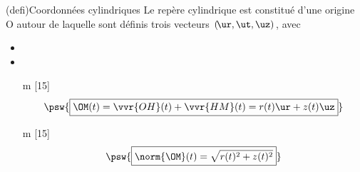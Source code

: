\documentclass[../../main/main.tex]{subfiles}
\begin{document}
\begin{tcb*}[sidebyside, righthand ratio=.35](defi){Coordonnées cylindriques}
	Le repère cylindrique est constitué d'une origine O autour de laquelle sont
	définis trois vecteurs $(\!\ur,\ut,\uz)$, avec
	\begin{itemize}
		\item {}
		\item {}%
		\item[m][15]
		      \[
			      \psw{\boxed{\OM(t) = \vvr{OH}(t) + \vvr{HM}(t) = r(t)\ur + z(t)\uz}}
		      \]
		\item[m][15]
		      \[
			      \psw{\boxed{\norm{\OM}(t) = \sqrt{r(t)^2 + z(t)^2}}}
		      \]
	\end{itemize}
	\tcblower
	\begin{center}
\end{center}
\end{tcb*}
\end{document}
